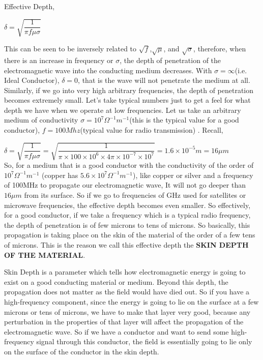 Effective Depth, \begin{center}
$\delta=\sqrt{\dfrac{1}{\pi f \mu\sigma}}$
\end{center}

This can be seen to be inversely related to $\sqrt{f}$,$\sqrt{\mu}$, and $\sqrt{{\sigma}}$, therefore, when there is an increase in frequency or $\sigma$, the depth of penetration of the electromagnetic wave into the conducting medium decreases. With $\sigma=\infty$(i.e. Ideal Conductor), $\delta=0$, that is the wave will not penetrate the medium at all. Similarly, if we go into very high arbitrary frequencies, the depth of penetration becomes extremely small. Let's take typical numbers just to get a feel for what depth we have when we operate at low frequencies.\newline
Let us take an arbitrary medium of conductivity $\sigma=10^{7}\Omega^{-1}m^{-1}$(this is the typical value for a good conductor), $f=100Mhz$(typical value for radio transmission) .\newline
Recall,

$\delta=\sqrt{\dfrac{1}{\pi f\mu\sigma}}=\sqrt{\dfrac{1}{\pi\times 100\times 10^{6}\times 4\pi\times 10^{-7}\times 10^{7}}}=1.6\times 10^{-5}m=16\mu m$
\\
So, for a medium that is a good conductor with the conductivity of the order of  $ 10^{7}\Omega^{-1}m^{-1} $ (copper has $ 5.6 \times 10^{7}\Omega^{-1}m^{-1} $), like copper or silver and a frequency of 100MHz to propagate our electromagnetic wave, It will not go deeper than $16\mu m$ from its surface. So if we go to frequencies of GHz used for satellites or microwave frequencies, the effective depth becomes even smaller. So effectively, for a good conductor, if we take a frequency which is a typical radio frequency, the depth of penetration is of few microns to tens of microns. So basically, this propagation is taking place on the skin of the material of the order of a few tens of microns. This is the reason we call this effective depth the \textbf{SKIN DEPTH OF THE MATERIAL}.

Skin Depth is a parameter which tells how electromagnetic energy is going to exist on a good conducting material or medium. Beyond this depth, the propagation does not matter as the field would have died out. So if you have a high-frequency component, since the energy is going to lie on the surface at a few microns or tens of microns, we have to make that layer very good, because any perturbation in the properties of that layer will affect the propagation of the electromagnetic wave. So if we have a conductor and want to send some high-frequency signal through this conductor, the field is essentially going to lie only on the surface of the conductor in the skin depth.

